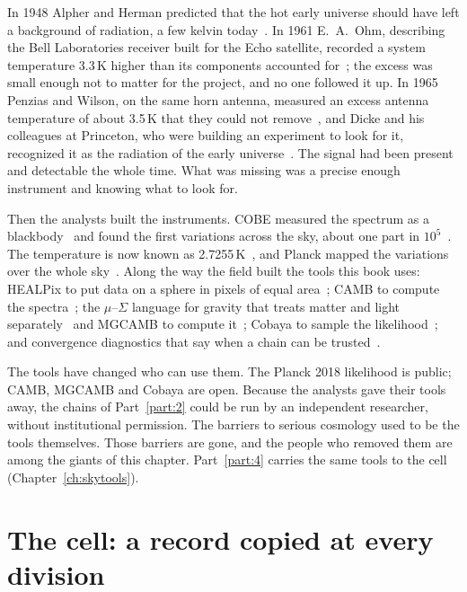 In 1948 Alpher and Herman predicted that the hot early universe should have left a background of radiation, a few kelvin
today~\cite{AlpherHerman1948}. In 1961 E.~A.~Ohm, describing the Bell Laboratories receiver built for the Echo satellite, recorded a system
temperature 3.3\,K higher than its components accounted for~\cite{Ohm1961,Wilson1979}; the excess was small enough not to matter for the
project, and no one followed it up. In 1965 Penzias and Wilson, on the same horn antenna, measured an excess antenna temperature of about
3.5\,K that they could not remove~\cite{PenziasWilson1965}, and Dicke and his colleagues at Princeton, who were building an experiment to
look for it, recognized it as the radiation of the early universe~\cite{Dicke1965}. \observed{} The signal had been present and detectable
the whole time. What was missing was a precise enough instrument and knowing what to look for.

Then the analysts built the instruments. COBE measured the spectrum as a blackbody~\cite{Mather1994} and found the first variations across the
sky, about one part in $10^5$~\cite{Smoot1992}. The temperature is now known as 2.7255\,K~\cite{Fixsen2009}, and Planck mapped the variations over
the whole sky~\cite{Planck2018I,Planck2018VI}. \observed{} Along the way the field built the tools this book uses: HEALPix to put data on a
sphere in pixels of equal area~\cite{Gorski2005}; CAMB to compute the spectra~\cite{Lewis2000CAMB}; the $\mu$--$\Sigma$ language for
gravity that treats matter and light separately~\cite{PogosianSilvestri2016} and MGCAMB to compute it~\cite{Zhao2009MGCAMB,Wang2023MGCAMB};
Cobaya to sample the likelihood~\cite{Torrado2021}; and convergence diagnostics that say when a chain can be trusted~\cite{Gelman1992}.

The tools have changed who can use them. The Planck 2018 likelihood is public; CAMB, MGCAMB and Cobaya are open. Because the analysts gave
their tools away, the chains of Part~\ref{part:2} could be run by an independent researcher, without institutional permission. The barriers
to serious cosmology used to be the tools themselves. Those barriers are gone, and the people who removed them are among the giants of this
chapter. Part~\ref{part:4} carries the same tools to the cell (Chapter~\ref{ch:skytools}).

\section*{The cell: a record copied at every division}

